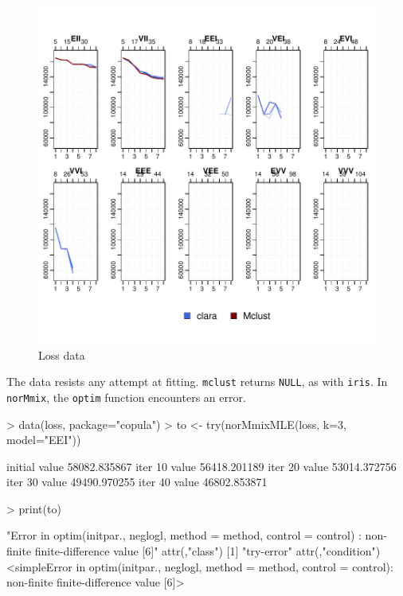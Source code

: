 \begin{figure}[h!]
    \begin{Rgraph}[0.9]
\includegraphics{chapter3-figloss}
    \caption{Loss data}
    \label{fig:loss}
    \end{Rgraph}
\end{figure}

The data resists any attempt at fitting. {\tt mclust} returns {\tt NULL}, as 
with {\tt iris}. In {\tt norMmix}, the {\tt optim} function encounters an error.

\begin{Schunk}
\begin{Sinput}
>     data(loss, package="copula")
>     to <- try(norMmixMLE(loss, k=3, model="EEI"))
\end{Sinput}
\begin{Soutput}
initial  value 58082.835867 
iter  10 value 56418.201189
iter  20 value 53014.372756
iter  30 value 49490.970255
iter  40 value 46802.853871
\end{Soutput}
\begin{Sinput}
>     print(to)
\end{Sinput}
\begin{Soutput}
[1] "Error in optim(initpar., neglogl, method = method, control = control) : \n  non-finite finite-difference value [6]\n"
attr(,"class")
[1] "try-error"
attr(,"condition")
<simpleError in optim(initpar., neglogl, method = method, control = control): non-finite finite-difference value [6]>
\end{Soutput}
\end{Schunk}

